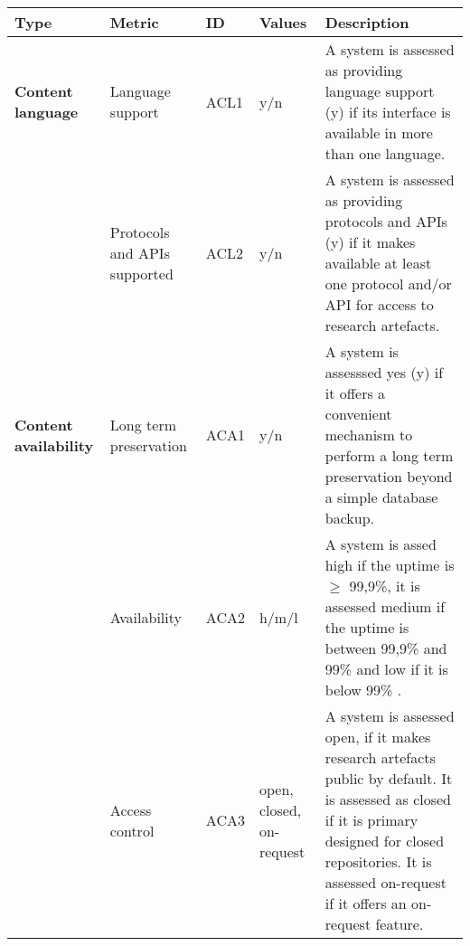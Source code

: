 \begin{tabular}{|m{2.5cm}|m{3cm}|m{1cm}|m{1cm}|p{8cm}|}
\hline \textbf{Type}&\textbf{Metric}&\textbf{ID}&\textbf{Values}&\textbf{Description}\\ \hline
\textbf{Content language}&Language support&ACL1&y/n&A system is assessed as providing language support (y) if its interface is available in more than one language.\\ \hline
\textbf{}&Protocols and APIs supported&ACL2&y/n&A system is assessed as providing protocols and APIs (y) if it makes available at least one protocol and/or API for access to research artefacts.\\ \hline
\textbf{Content availability}&Long term preservation&ACA1&y/n&A system is assesssed yes (y) if it offers a convenient mechanism to perform a long term preservation beyond a simple database backup.\\ \hline
\textbf{}&Availability&ACA2&h/m/l&A system is assed high if the uptime is $\geq$ 99,9\%, it is assessed medium if the uptime is between 99,9\% and 99\% and low if it is below 99\% .\\ \hline
\textbf{}&Access control&ACA3&open, closed, on-request&A system is assessed open, if it makes research artefacts public by default. It is assessed as closed if it is primary designed for closed repositories. It is assessed on-request if it offers an on-request feature.\\ \hline
\end{tabular}



